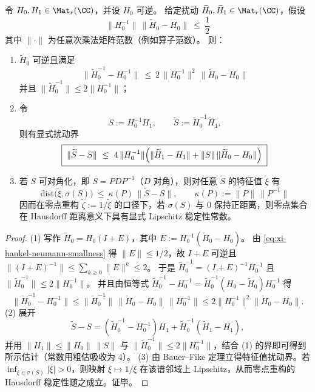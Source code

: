 \begin{proposition}\label{prop:xi-hankel-inversion-noise-stability-neumann-bauerfike}
令 \(H_0,H_1\in\Mat_r(\CC)\)，并设 \(H_0\) 可逆。
给定扰动 \(\widetilde H_0,\widetilde H_1\in\Mat_r(\CC)\)，假设
\begin{equation}\label{eq:xi-hankel-neumann-smallness}
\boxed{\;
\|H_0^{-1}\|\,\|\widetilde H_0-H_0\|\ \le\ \frac12\;}
\end{equation}
其中 \(\|\cdot\|\) 为任意次乘法矩阵范数（例如算子范数）。
则：
\begin{enumerate}
  \item \(\widetilde H_0\) 可逆且满足
  \[
  \boxed{\;
  \|\widetilde H_0^{-1}-H_0^{-1}\|
  \ \le\
  2\,\|H_0^{-1}\|^{2}\,\|\widetilde H_0-H_0\|\;}
  \]
  并且 \(\|\widetilde H_0^{-1}\|\le 2\|H_0^{-1}\|\)；
  \item 令
  \[
  S:=H_0^{-1}H_1,\qquad \widetilde S:=\widetilde H_0^{-1}\widetilde H_1,
  \]
  则有显式扰动界
  \[
  \boxed{\;
  \|\widetilde S-S\|
  \ \le\
  4\,\|H_0^{-1}\|\Bigl(\|\widetilde H_1-H_1\|+\|S\|\,\|\widetilde H_0-H_0\|\Bigr)\;}
  \]
  \item 若 \(S\) 可对角化，即 \(S=PDP^{-1}\)（\(D\) 对角），则对任意 \(\widetilde S\) 的特征值 \(\widetilde\xi\) 有
  \[
  \boxed{\;
  \mathrm{dist}\bigl(\widetilde\xi,\sigma(S)\bigr)\ \le\ \kappa(P)\,\|\widetilde S-S\|,
  \qquad \kappa(P):=\|P\|\,\|P^{-1}\|\;}
  \]
  因而在零点重构 \(\widetilde\zeta:=1/\widetilde\xi\) 的口径下，若 \(\sigma(S)\) 与 \(0\) 保持正距离，则零点集合在 Hausdorff 距离意义下具有显式 Lipschitz 稳定性常数。
\end{enumerate}
\end{proposition}
\begin{proof}
(1) 写作 \(\widetilde H_0=H_0(I+E)\)，其中 \(E:=H_0^{-1}(\widetilde H_0-H_0)\)。
由 \eqref{eq:xi-hankel-neumann-smallness} 得 \(\|E\|\le 1/2\)，故 \(I+E\) 可逆且
\(\|(I+E)^{-1}\|\le \sum_{k\ge 0}\|E\|^k\le 2\)。
于是 \(\widetilde H_0^{-1}=(I+E)^{-1}H_0^{-1}\) 且 \(\|\widetilde H_0^{-1}\|\le 2\|H_0^{-1}\|\)。
并且由恒等式
\(
\widetilde H_0^{-1}-H_0^{-1}=\widetilde H_0^{-1}(H_0-\widetilde H_0)H_0^{-1}
\)
得
\[
\|\widetilde H_0^{-1}-H_0^{-1}\|
\le \|\widetilde H_0^{-1}\|\,\|\widetilde H_0-H_0\|\,\|H_0^{-1}\|
\le 2\|H_0^{-1}\|^2\|\widetilde H_0-H_0\|.
\]
(2) 展开
\[
\widetilde S-S
=(\widetilde H_0^{-1}-H_0^{-1})H_1+\widetilde H_0^{-1}(\widetilde H_1-H_1),
\]
并用 \(\|H_1\|\le \|H_0\|\,\|S\|\) 与 \(\|\widetilde H_0^{-1}\|\le 2\|H_0^{-1}\|\)，结合 (1) 的界即可得到所示估计（常数用粗估吸收为 \(4\)）。
(3) 由 Bauer--Fike 定理立得特征值扰动界。若 \(\inf_{\xi\in\sigma(S)}|\xi|>0\)，则映射 \(\xi\mapsto 1/\xi\) 在该谱邻域上 Lipschitz，从而零点重构的 Hausdorff 稳定性随之成立。证毕。
\end{proof}

